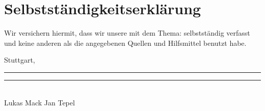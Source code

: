 
\thispagestyle{plain}
\section*{Selbstständigkeitserklärung}

\vspace*{2em}


Wir versichern hiermit, dass wir unsere {\arbeit} mit dem Thema: {\itshape{} \titel{}\/} selbstständig verfasst und keine anderen als die angegebenen Quellen und Hilfsmittel benutzt habe.

\vspace{3em}

Stuttgart, \datumAbgabe
\vspace{4em}

\rule{6cm}{0.4pt} \hspace{3.8cm}  \rule{6cm}{0.4pt}\\
Lukas Mack \hspace{7.55cm} Jan Tepel
